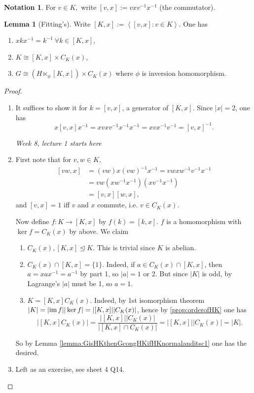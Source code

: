\documentclass[a4paper]{article}
\newcommand{\la}{\left\langle}
\newcommand{\ra}{\right\rangle}
\newcommand{\im}{\text{im\,}}
\theoremstyle{definition}
\newtheorem{lemma}[defn]{Lemma}
\newtheorem*{notation}{Notation}
\begin{document}
\begin{notation}
For $v\in K,$ write $[v,x]:=vxv^{-1}x^{-1}$ (the commutator).
\end{notation}

\begin{lemma}[Fitting's]
Write $[K,x]:=\la[v,x]:v\in K\ra$. One has
\begin{enumerate}
\item $xkx^{-1}=k^{-1} \ \forall k\in [K,x]$,
\item $K\cong [K,x]\times C_K(x)$,
\item $G\cong (H\ltimes_\phi [K,x])\times C_K(x)$ where $\phi$ is inversion homomorphism.
\end{enumerate}
\end{lemma}
\begin{proof}
\begin{enumerate}
\item It suffices to show it for $k=[v,x]$, a generator of $[K,x]$. Since $|x|=2$, one has
\[
x[v,x]x^{-1}=xvxv^{-1}x^{-1}x^{-1}=xvx^{-1}v^{-1}=[v,x]^{-1}.
\]

\begin{flushright}
\textit{Week 8, lecture 1 starts here}
\end{flushright}

\item First note that for $v,w\in K,$
\[
\begin{aligned}
[vw,x]&=(vw)x(vw)^{-1}x^{-1}=vwxw^{-1}v^{-1}x^{-1}\\
&=vw\left(xw^{-1}x^{-1}\right)\left(xv^{-1}x^{-1}\right) \\
&=[v,x][w,x],
\end{aligned}
\]
and $[v,x]=1$ iff $v$ and $x$ commute, i.e. $v\in C_K(x)$.

Now define $f:K\rightarrow [K,x]$ by $f(k)=[k,x]$. $f$ is a homomorphism with $\ker f=C_K(x)$ by above. We claim \begin{enumerate}
\item $C_K(x),[K,x]\unlhd K$. This is trivial since $K$ is abelian.
\item $C_K(x)\cap [K,x]=\{1\}$. Indeed, if $a\in C_K(x)\cap [K,x]$, then $a=xax^{-1}=a^{-1}$ by part 1, so $|a|=1$ or 2. But since $|K|$ is odd, by Lagrange's $|a|$ must be 1, so $a=1$.
\item $K=[K,x]C_K(x)$. Indeed, by 1st isomorphism theorem $|K|=|\im f||\ker f|=|[K,x]||C_K(x)|$, hence by \ref{prop:orderofHK} one has
\[
|[K,x]C_K(x)|=\frac{|[K,x]||C_K(x)|}{|[K,x]\cap C_K(x)|}=|[K,x]||C_K(x)|=|K|.
\]
\end{enumerate}
So by Lemma \ref{lemma:GisHKthenGcongHKifHKnormalanditsc1} one has the desired.
\item Left as an exercise, see sheet 4 Q14.
\end{enumerate}
\end{proof}
\end{document}
